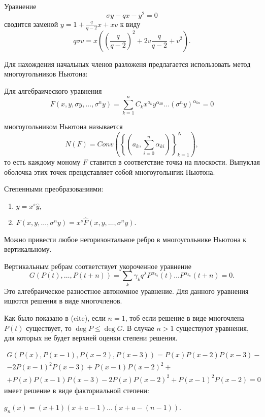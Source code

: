 \documentclass[a4paper, 14pt]{extarticle}
\begin{document}
    \begin{example}
    Уравнение
    \[\sigma y- qx - y^2 = 0\]
    сводится заменой $y = 1 + \frac{q}{q-2}x + xv$
    к виду 
    \[q \sigma v = x\left(\left( \frac{q}{q-2} \right)^2 + 2 v \frac{q}{q-2} + v^2 \right). \]
    \end{example}

    Для нахождения начальных членов разложеня предлагается использовать метод многоугольников Ньютона: 

    \begin{definition}
        Для алгебраического уравнения
        $$F(x, y, \sigma y, \ldots, \sigma^n y) = \sum_{k=1}^n C_k x^{a_k} y^{\alpha_{k0}} \ldots (\sigma^n y)^{\alpha_{kn}}=0$$ 

        многоугольником Ньютона называется
        $$N(F) = Conv \left( \left\{ \left(a_k, \sum_{i=0}^n \alpha_{ki}\right)\right\}_{k=1}^N\right),$$
        то есть каждому моному $F$ ставится в соответствие точка на плоскости. Выпуклая оболочка этих точек прендставляет собой многоугольнгик Ньютона.
    \end{definition}

    \begin{lemma}
        Степенными преобразованиями:
        \begin{enumerate}
            \item $y = x^s \hat{y},$
            \item $F (x, y, \ldots, \sigma^n y) = x^s \hat{F} (x, y, \ldots, \sigma^n y)$.
        \end{enumerate}
Можно привести любое негоризонтальное ребро в
многоугольнике Ньютона к вертикальному.
    \end{lemma}

    Вертикальным ребрам соответствует укороченное уравнение
    \begin{equation}
    G(P(t),\ldots, P(t+n)) = \sum_k \gamma_k q^\lambda P^{\alpha_{k_0}}(t)\ldots P^{\alpha_{k_n}}(t+n)= 0. \label{eq:3}\end{equation}
    Это алгебраическое разностное автономное уравнение.
    Для данного уравнения ищются решения в виде многочленов.

    Как было показано в (cite), если $n=1$, тоб если решение в виде многочлена $P(t)$ существует, то $\deg P \leq \deg G$.
    В случае $n>1$ существуют уравнения, для которых не будет верхней оценки степени решения.

    \begin{example}
        \begin{multline}
    G(P(x), P(x-1), P(x-2), P(x-3)) = P(x)P(x-2)P(x-3) -\\- 2P(x-1)^2 P(x-3) + P(x-1)P(x-2)^2 +\\
    + P(x)P(x-1)P(x-3) - 2P(x)P(x-2)^2 + P(x-1)^2 P(x-2) = 0
\end{multline}
имеет решение в виде факториальной степени:

$g_n(x) = (x+1)(x+a-1)\ldots(x+a-(n-1))$.

    \end{example}
\end{document}
